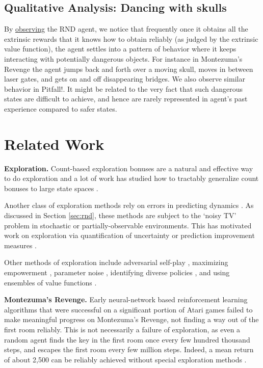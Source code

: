 \documentclass{article} \usepackage[dvipsnames]{xcolor}
\begin{document}
\subsection{Qualitative Analysis: Dancing with skulls}
By \href{https://github.com/openai/random-network-distillation}{observing} the RND agent, we notice that frequently once it obtains all the extrinsic rewards that it knows how to obtain reliably (as judged by the extrinsic value function), the agent settles into a pattern of behavior where it keeps interacting with potentially dangerous objects. For instance in Montezuma's Revenge the agent jumps back and forth over a moving skull, moves in between laser gates, and gets on and off disappearing bridges. We also observe similar behavior in Pitfall!. It might be related to the very fact that such dangerous states are difficult to achieve, and hence are rarely represented in agent's past experience compared to safer states.


\section{Related Work}
\textbf{Exploration.} Count-based exploration bonuses are a natural and effective way to do exploration \citep{strehl2008analysis} and a lot of work has studied how to tractably generalize count bonuses to large state spaces \citep{bellemare2016unifying,fu2017ex2,pixelcnncount,tang2016exploration,machado2018count,fox2018dora}.

Another class of exploration methods rely on errors in predicting dynamics \citep{schmidhuber_curiosity,stadie2015incentivizing,josh_surprise,pathakICMl17curiosity,burda18largescale}. As discussed in Section \ref{sec:rnd}, these methods are subject to the `noisy TV' problem in stochastic or partially-observable environments. This has motivated work on exploration via quantification of uncertainty \citep{still2012information,houthooft2016vime} or prediction improvement measures \citep{schmidhuber1991curious,oudeyer2007intrinsic,lopes2012exploration,josh_surprise}.

Other methods of exploration include adversarial self-play \citep{sukhbaatar2017intrinsic}, maximizing empowerment \citep{gregor2017variational}, parameter noise \citep{plappert2017parameter, fortunato2017noisy}, identifying diverse policies \citep{diyn, achiam2018variational}, and using ensembles of value functions \citep{osband2018randomized,osband2016deep,chen2017ucb}.

\textbf{Montezuma's Revenge.} Early neural-network based reinforcement learning algorithms that were successful on a significant portion of Atari games \citep{dqn,a3c,hessel2017rainbow} failed to make meaningful progress on Montezuma's Revenge, not finding a way out of the first room reliably. This is not necessarily a failure of exploration, as even a random agent finds the key in the first room once every few hundred thousand steps, and escapes the first room every few million steps. Indeed, a mean return of about 2,500 can be reliably achieved without special exploration methods \citep{horgan2018distributed,espeholt2018impala,oh2018self}.
\end{document}
